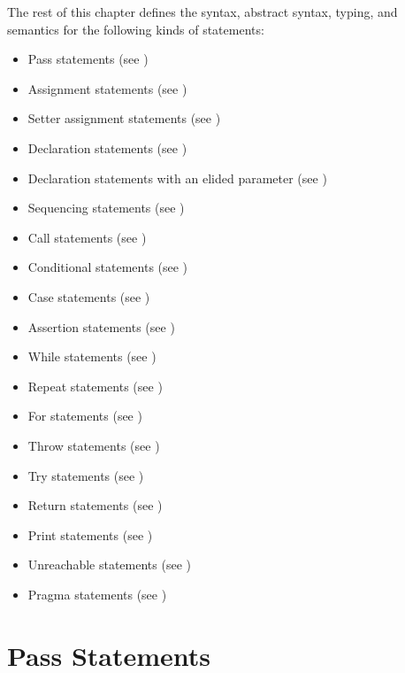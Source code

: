 The rest of this chapter defines the syntax, abstract syntax, typing,
and semantics for the following kinds of statements:
\begin{itemize}
\item Pass statements (see )
\item Assignment statements (see )
\item Setter assignment statements (see )
\item Declaration statements (see )
\item Declaration statements with an elided parameter (see )
\item Sequencing statements (see )
\item Call statements (see )
\item Conditional statements (see )
\item Case statements (see )
\item Assertion statements (see )
\item While statements (see )
\item Repeat statements (see )
\item For statements (see )
\item Throw statements (see )
\item Try statements (see )
\item Return statements (see )
\item Print statements (see )
\item Unreachable statements (see )
\item Pragma statements (see )
\end{itemize}

\section{Pass Statements\label{sec:PassStatements}}
\hypertarget{def-passstatementterm}{}


